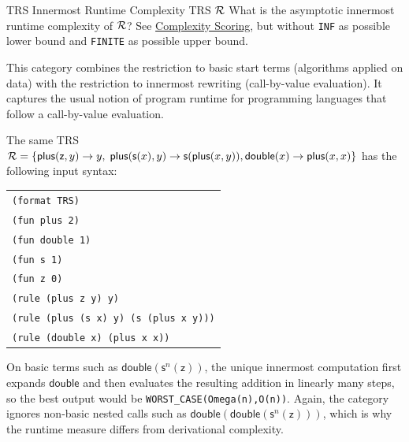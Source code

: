 \begin{formalproblem}
  {TRS Innermost Runtime Complexity}
  {TRS $\mathcal{R}$}
  {What is the asymptotic innermost runtime complexity of $\mathcal{R}$?}
  {See \hyperref[scoring_complexity]{Complexity Scoring}, but without \texttt{INF} as possible lower bound and \texttt{FINITE} as possible upper bound.}
\end{formalproblem}

\begin{motivation}
This category combines the restriction to basic start terms (algorithms applied on data)
with the restriction to innermost rewriting (call-by-value evaluation).
It captures the usual notion of program runtime for programming languages
that follow a call-by-value evaluation.
\end{motivation}

\begin{example}
The same TRS $\mathcal{R} = \{\mathsf{plus}(\mathsf{z}, y) \to y,\; \mathsf{plus}(\mathsf{s}(x), y) \to \mathsf{s}(\mathsf{plus}(x,y)),
\linebreak \mathsf{double}(x) \to \mathsf{plus}(x,x)\}$ has the following input syntax:
\begin{center}
\begin{tabular}{l}
\texttt{(format TRS)} \\
\texttt{(fun plus 2)} \\
\texttt{(fun double 1)} \\
\texttt{(fun s 1)} \\
\texttt{(fun z 0)} \\
\texttt{(rule (plus z y) y)} \\
\texttt{(rule (plus (s x) y) (s (plus x y)))} \\
\texttt{(rule (double x) (plus x x))}
\end{tabular}
\end{center}
On basic terms such as $\mathsf{double}(\mathsf{s}^n(\mathsf{z}))$, the unique innermost computation first expands $\mathsf{double}$ 
and then evaluates the resulting addition in linearly many steps, so the best output would be \texttt{WORST\_CASE(Omega(n),O(n))}. 
Again, the category ignores non-basic nested calls such as $\mathsf{double}(\mathsf{double}(\mathsf{s}^n(\mathsf{z})))$, 
which is why the runtime measure differs from derivational complexity.
\end{example}